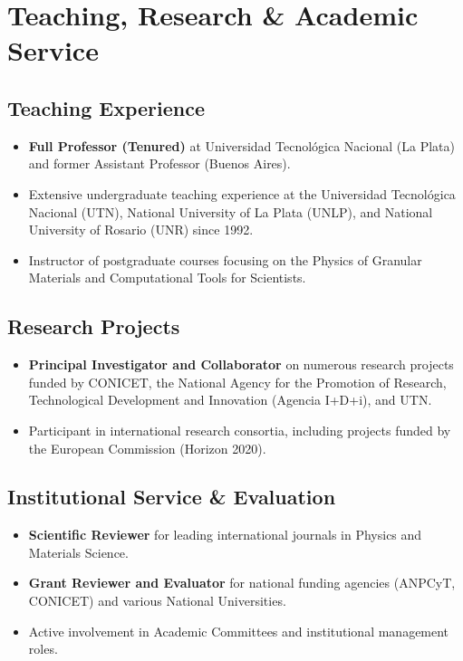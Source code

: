 \section*{Teaching, Research \& Academic Service}

\subsection*{Teaching Experience}
\begin{itemize}
	\item \textbf{Full Professor (Tenured)} at Universidad Tecnológica Nacional (La Plata) and former Assistant Professor (Buenos Aires).
	\item Extensive undergraduate teaching experience at the Universidad Tecnológica Nacional (UTN), National University of La Plata (UNLP), and National University of Rosario (UNR) since 1992.
	\item Instructor of postgraduate courses focusing on the Physics of Granular Materials and Computational Tools for Scientists.
\end{itemize}

\subsection*{Research Projects}
\begin{itemize}
	\item \textbf{Principal Investigator and Collaborator} on numerous research projects funded by CONICET, the National Agency for the Promotion of Research, Technological Development and Innovation (Agencia I+D+i), and UTN.
	\item Participant in international research consortia, including projects funded by the European Commission (Horizon 2020).
\end{itemize}

\subsection*{Institutional Service \& Evaluation}
\begin{itemize}
	\item \textbf{Scientific Reviewer} for leading international journals in Physics and Materials Science.
	\item \textbf{Grant Reviewer and Evaluator} for national funding agencies (ANPCyT, CONICET) and various National Universities.
	\item Active involvement in Academic Committees and institutional management roles.
\end{itemize}
